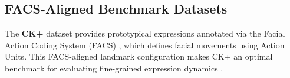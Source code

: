\subsection{FACS-Aligned Benchmark Datasets}
The \textbf{CK+} dataset provides prototypical expressions annotated via the Facial Action Coding System (FACS) \cite{Ekman1978FACS}, which defines facial movements using Action Units. 
This FACS-aligned landmark configuration makes CK+ an optimal benchmark for evaluating fine-grained expression dynamics \cite{Lucey2010CK}.
